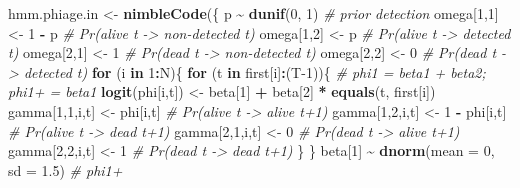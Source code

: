 \documentclass[
  12pt,
]{krantz}
\newenvironment{Shaded}{\begin{snugshade}}{\end{snugshade}}
\newcommand{\AttributeTok}[1]{\textcolor[rgb]{0.13,0.29,0.53}{#1}}
\newcommand{\CommentTok}[1]{\textcolor[rgb]{0.56,0.35,0.01}{\textit{#1}}}
\newcommand{\ControlFlowTok}[1]{\textcolor[rgb]{0.13,0.29,0.53}{\textbf{#1}}}
\newcommand{\DecValTok}[1]{\textcolor[rgb]{0.00,0.00,0.81}{#1}}
\newcommand{\FloatTok}[1]{\textcolor[rgb]{0.00,0.00,0.81}{#1}}
\newcommand{\FunctionTok}[1]{\textcolor[rgb]{0.13,0.29,0.53}{\textbf{#1}}}
\newcommand{\NormalTok}[1]{#1}
\newcommand{\OtherTok}[1]{\textcolor[rgb]{0.56,0.35,0.01}{#1}}
\newcommand{\SpecialCharTok}[1]{\textcolor[rgb]{0.81,0.36,0.00}{\textbf{#1}}}
\begin{document}
\begin{Shaded}
\begin{Highlighting}[]
\NormalTok{hmm.phiage.in }\OtherTok{\textless{}{-}} \FunctionTok{nimbleCode}\NormalTok{(\{}
\NormalTok{  p }\SpecialCharTok{\textasciitilde{}} \FunctionTok{dunif}\NormalTok{(}\DecValTok{0}\NormalTok{, }\DecValTok{1}\NormalTok{) }\CommentTok{\# prior detection}
\NormalTok{  omega[}\DecValTok{1}\NormalTok{,}\DecValTok{1}\NormalTok{] }\OtherTok{\textless{}{-}} \DecValTok{1} \SpecialCharTok{{-}}\NormalTok{ p    }\CommentTok{\# Pr(alive t {-}\textgreater{} non{-}detected t)}
\NormalTok{  omega[}\DecValTok{1}\NormalTok{,}\DecValTok{2}\NormalTok{] }\OtherTok{\textless{}{-}}\NormalTok{ p        }\CommentTok{\# Pr(alive t {-}\textgreater{} detected t)}
\NormalTok{  omega[}\DecValTok{2}\NormalTok{,}\DecValTok{1}\NormalTok{] }\OtherTok{\textless{}{-}} \DecValTok{1}        \CommentTok{\# Pr(dead t {-}\textgreater{} non{-}detected t)}
\NormalTok{  omega[}\DecValTok{2}\NormalTok{,}\DecValTok{2}\NormalTok{] }\OtherTok{\textless{}{-}} \DecValTok{0}        \CommentTok{\# Pr(dead t {-}\textgreater{} detected t)}
  \ControlFlowTok{for}\NormalTok{ (i }\ControlFlowTok{in} \DecValTok{1}\SpecialCharTok{:}\NormalTok{N)\{}
    \ControlFlowTok{for}\NormalTok{ (t }\ControlFlowTok{in}\NormalTok{ first[i]}\SpecialCharTok{:}\NormalTok{(T}\DecValTok{{-}1}\NormalTok{))\{}
    \CommentTok{\# phi1 = beta1 + beta2; phi1+ = beta1}
    \FunctionTok{logit}\NormalTok{(phi[i,t]) }\OtherTok{\textless{}{-}}\NormalTok{ beta[}\DecValTok{1}\NormalTok{] }\SpecialCharTok{+}\NormalTok{ beta[}\DecValTok{2}\NormalTok{] }\SpecialCharTok{*} \FunctionTok{equals}\NormalTok{(t, first[i]) }
\NormalTok{    gamma[}\DecValTok{1}\NormalTok{,}\DecValTok{1}\NormalTok{,i,t] }\OtherTok{\textless{}{-}}\NormalTok{ phi[i,t]      }\CommentTok{\# Pr(alive t {-}\textgreater{} alive t+1)}
\NormalTok{    gamma[}\DecValTok{1}\NormalTok{,}\DecValTok{2}\NormalTok{,i,t] }\OtherTok{\textless{}{-}} \DecValTok{1} \SpecialCharTok{{-}}\NormalTok{ phi[i,t]  }\CommentTok{\# Pr(alive t {-}\textgreater{} dead t+1)}
\NormalTok{    gamma[}\DecValTok{2}\NormalTok{,}\DecValTok{1}\NormalTok{,i,t] }\OtherTok{\textless{}{-}} \DecValTok{0}             \CommentTok{\# Pr(dead t {-}\textgreater{} alive t+1)}
\NormalTok{    gamma[}\DecValTok{2}\NormalTok{,}\DecValTok{2}\NormalTok{,i,t] }\OtherTok{\textless{}{-}} \DecValTok{1}             \CommentTok{\# Pr(dead t {-}\textgreater{} dead t+1)}
\NormalTok{    \}}
\NormalTok{  \}}
\NormalTok{  beta[}\DecValTok{1}\NormalTok{] }\SpecialCharTok{\textasciitilde{}} \FunctionTok{dnorm}\NormalTok{(}\AttributeTok{mean =} \DecValTok{0}\NormalTok{, }\AttributeTok{sd =} \FloatTok{1.5}\NormalTok{) }\CommentTok{\# phi1+}

\end{Highlighting}
\end{Shaded}
\end{document}
